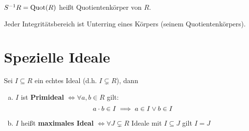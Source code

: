 \documentclass[a4paper]{report}
\begin{document}
\begin{defi}[Quotientenkörper]
$S^{-1}R = \operatorname{Quot}(R)$ heißt Quotientenkörper von $R$.
\end{defi}

\begin{bem}
Jeder Integritätsbereich ist Unterring eines Körpers (seinem Quotientenkörpers).
\end{bem}
\section{Spezielle Ideale}%
\begin{defi}
  Sei $I \subseteq R$ ein echtes Ideal (d.h. $I \subsetneq R$), dann
  \begin{enumerate}[(a)]
    \item $I$ ist \textbf{Primideal} $\iff \forall a, b \in R$ gilt:
          \[a \cdot b \in I \implies a \in I \vee b \in I\]
    \item $I$ heißt \textbf{maximales Ideal} $\iff \forall J \subsetneq R$ Ideale mit $I \subseteq J$ gilt $I = J$
  \end{enumerate}
\end{defi}
\end{document}

